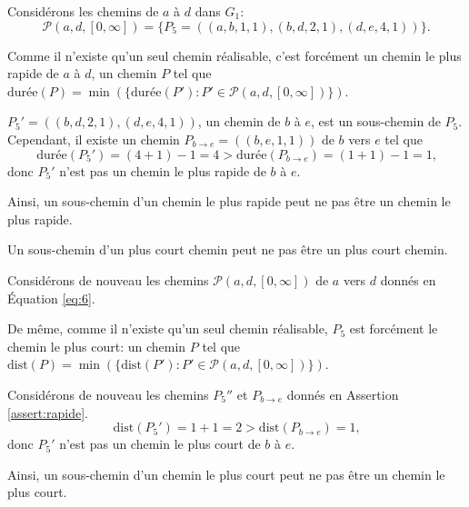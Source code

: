 \begin{reponse}
  Considérons les chemins de $a$ à $d$ dans $G_{1}$:
  \begin{equation}
    \mathcal{P}(a,d,[0, \infty]) = \{P_5 = ((a,b,1,1),(b,d,2,1),(d,e,4,1))\} \text{.}
    \label{eq:6}
  \end{equation}

  Comme il n'existe qu'un seul chemin réalisable, c'est forcément un chemin le
  plus rapide de $a$ à $d$, un chemin $P$ tel que
  $\mathrm{durée}(P) = \min(\{\mathrm{durée}(P'): P' \in \mathcal{P}(a,d,[0,
  \infty]) \})$.

  $P_{5}' = ((b,d,2,1),(d,e,4,1))$, un chemin de $b$ à $e$, est un sous-chemin
  de $P_5$. Cependant, il existe un chemin $P_{b \rightarrow e} = ((b,e,1,1))$
  de $b$ vers $e$ tel que
  \begin{equation}
    \mathrm{durée}(P_{5}') = (4+1) - 1 = 4 > \mathrm{durée}(P_{b \rightarrow e}) = (1+1) - 1 = 1 \text{,}
    \label{eq:3}
  \end{equation}
  donc $P_{5}'$ n'est pas un chemin le plus rapide de $b$ à $e$.

  Ainsi, un sous-chemin d'un chemin le plus rapide peut ne pas être un chemin le
  plus rapide.
\end{reponse}

\begin{assertion}
  Un sous-chemin d'un plus court chemin peut ne pas être un plus court chemin.
\end{assertion}

\begin{reponse}
  Considérons de nouveau les chemins $\mathcal{P}(a,d,[0, \infty])$ de $a$ vers
  $d$ donnés en Équation \ref{eq:6}.

  De même, comme il n'existe qu'un seul chemin réalisable, $P_5$ est forcément
  le chemin le plus court: un chemin $P$ tel que
  $\mathrm{dist}(P) = \min(\{\mathrm{dist}(P'): P' \in \mathcal{P}(a,d,[0,
  \infty]) \})$.

  Considérons de nouveau les chemins $P_{5}''$ et $P_{b \rightarrow e}$ donnés
  en Assertion \ref{assert:rapide}.
  \begin{equation}
    \mathrm{dist}(P_{5}') = 1 + 1 = 2 > \mathrm{dist}(P_{b \rightarrow e}) = 1 \text{,}
    \label{eq:3}
  \end{equation}
  donc $P_{5}'$ n'est pas un chemin le plus court de $b$ à $e$.

  Ainsi, un sous-chemin d'un chemin le plus court peut ne pas être un chemin le
  plus court.

\end{reponse}

\vfill

